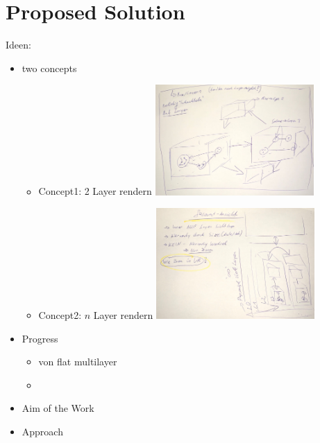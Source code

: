 \chapter{Proposed Solution}
Ideen:
\begin{itemize}
    \item two concepts
        \begin{itemize}
            \item Concept1: 2 Layer rendern
            \includegraphics[width=0.5\textwidth]{chapters/graphics/concept1.jpg}
            \item Concept2: $n$ Layer rendern
            \includegraphics[width=0.5\textwidth]{chapters/graphics/concept2.jpg}
        \end{itemize}
    \item Progress
        \begin{itemize}
            \item von flat multilayer
            \item  
        \end{itemize}
    \item Aim of the Work
    \item Approach
\end{itemize}

